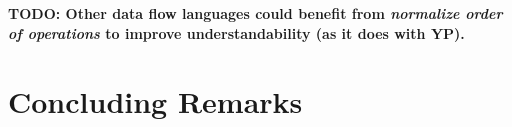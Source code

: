 \documentclass[10pt,conference,compsocconf]{IEEEtran}
\newcommand{\todo}[1]{\textbf{TODO: #1}}
\begin{document}
\todo{Other data flow languages could benefit from \emph{normalize order of operations} to improve understandability (as it does with YP). }

\section{Concluding Remarks}
\label{sec:conclusions}

\newpage
\balance





\end{document}
